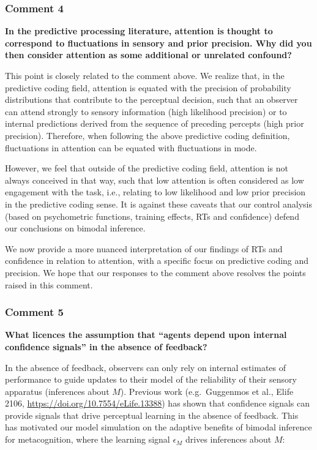 \documentclass[
]{article}
\begin{document}
\hypertarget{comment-4}{%
\subsubsection{Comment 4}\label{comment-4}}

\textbf{In the predictive processing literature, attention is thought to
correspond to fluctuations in sensory and prior precision. Why did you
then consider attention as some additional or unrelated confound?}

This point is closely related to the comment above. We realize that, in
the predictive coding field, attention is equated with the precision of
probability distributions that contribute to the perceptual decision,
such that an observer can attend strongly to sensory information (high
likelihood precision) or to internal predictions derived from the
sequence of preceding percepts (high prior precision). Therefore, when
following the above predictive coding definition, fluctuations in
attention can be equated with fluctuations in mode.

However, we feel that outside of the predictive coding field, attention
is not always conceived in that way, such that low attention is often
considered as low engagement with the task, i.e., relating to low
likelihood and low prior precision in the predictive coding sense. It is
against these caveats that our control analysis (based on psychometric
functions, training effects, RTs and confidence) defend our conclusions
on bimodal inference.

We now provide a more nuanced interpretation of our findings of RTs and
confidence in relation to attention, with a specific focus on predictive
coding and precision. We hope that our responses to the comment above
resolves the points raised in this comment.

\hypertarget{comment-5}{%
\subsubsection{Comment 5}\label{comment-5}}

\textbf{What licences the assumption that ``agents depend upon internal
confidence signals'' in the absence of feedback?}

In the absence of feedback, observers can only rely on internal
estimates of performance to guide updates to their model of the
reliability of their sensory apparatus (inferences about \(M\)).
Previous work (e.g.~Guggenmos et al., Elife 2106,
\url{https://doi.org/10.7554/eLife.13388}) has shown that confidence
signals can provide signals that drive perceptual learning in the
absence of feedback. This has motivated our model simulation on the
adaptive benefits of bimodal inference for metacognition, where the
learning signal \(\epsilon_M\) drives inferences about \(M\):
\end{document}
